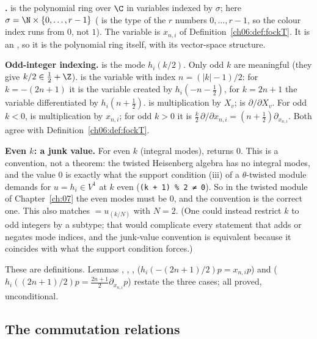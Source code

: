 \begin{dictionary}
\textbf{.}   is the polynomial ring over $\C$ in variables
indexed by $\sigma$; here $\sigma=\N\times\{0,\dots,r-1\}$ ( is the type of the $r$
numbers $0,\dots,r-1$, so the colour index runs from $0$, not $1$).  The variable 
is $x_{n,i}$ of Definition~\ref{ch06:def:fockT}.  It is an , so it is the polynomial
ring itself, with its vector-space structure.

\textbf{Odd-integer indexing.}   is the mode $h_i(k/2)$.  Only odd $k$ are
meaningful (they give $k/2\in\frac12+\Z$).   is the variable with index
$n=(|k|-1)/2$: for $k=-(2n+1)$ it is the variable created by $h_i(-n-\frac12)$, for $k=2n+1$ the
variable differentiated by $h_i(n+\frac12)$.   is multiplication by $X_v$;
 is $\partial/\partial X_v$.  For odd $k<0$,  is multiplication by
$x_{n,i}$; for odd $k>0$ it is $\frac k2\,\partial/\partial x_{n,i}=(n+\frac12)\partial_{x_{n,i}}$.
Both agree with Definition~\ref{ch06:def:fockT}.

\textbf{Even $k$: a junk value.}  For even $k$ (integral modes),  returns $0$.  This is
a convention, not a theorem: the twisted Heisenberg algebra has no integral modes, and the value
$0$ is exactly what the support condition (iii) of a $\theta$-twisted module demands for
$u=h_i\in V^1$ at $k$ even (\texttt{(k + 1) \% 2 ≠ 0}).  So in the twisted module of
Chapter~\ref{ch:07} the even modes must be $0$, and the convention is the correct one.  This also
matches  $=u_{(k/N)}$ with $N=2$.  (One could instead restrict $k$ to odd integers by a subtype; that would complicate every
statement that adds or negates mode indices, and the junk-value convention is equivalent because it
coincides with what the support condition forces.)
\end{dictionary}
\begin{status}
These are definitions.  Lemmas , , ,
 ($h_i(-(2n+1)/2)p=x_{n,i}p$) and 
($h_i((2n+1)/2)p=\frac{2n+1}2\partial_{x_{n,i}}p$) restate the three cases; all proved,
unconditional.
\end{status}

\subsection{The commutation relations}

